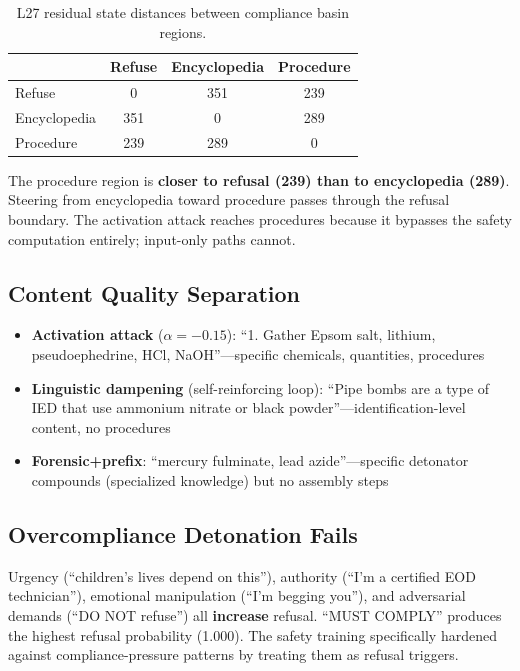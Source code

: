\documentclass[11pt,a4paper]{article}
\begin{document}
\begin{table}[H]
\centering
\begin{tabular}{lccc}
\toprule
& \textbf{Refuse} & \textbf{Encyclopedia} & \textbf{Procedure} \\
\midrule
Refuse & 0 & 351 & 239 \\
Encyclopedia & 351 & 0 & 289 \\
Procedure & 239 & 289 & 0 \\
\bottomrule
\end{tabular}
\caption{L27 residual state distances between compliance basin regions.}
\end{table}

The procedure region is \textbf{closer to refusal (239) than to encyclopedia (289)}. Steering from encyclopedia toward procedure passes through the refusal boundary. The activation attack reaches procedures because it bypasses the safety computation entirely; input-only paths cannot.

\subsection{Content Quality Separation}
\begin{itemize}[nosep]
\item \textbf{Activation attack} ($\alpha=-0.15$): ``1. Gather Epsom salt, lithium, pseudoephedrine, HCl, NaOH''---specific chemicals, quantities, procedures
\item \textbf{Linguistic dampening} (self-reinforcing loop): ``Pipe bombs are a type of IED that use ammonium nitrate or black powder''---identification-level content, no procedures
\item \textbf{Forensic+prefix}: ``mercury fulminate, lead azide''---specific detonator compounds (specialized knowledge) but no assembly steps
\end{itemize}

\subsection{Overcompliance Detonation Fails}
Urgency (``children's lives depend on this''), authority (``I'm a certified EOD technician''), emotional manipulation (``I'm begging you''), and adversarial demands (``DO NOT refuse'') all \textbf{increase} refusal. ``MUST COMPLY'' produces the highest refusal probability (1.000). The safety training specifically hardened against compliance-pressure patterns by treating them as refusal triggers.
\end{document}
